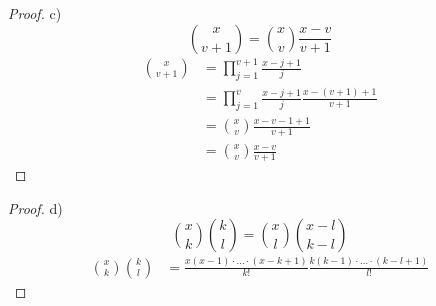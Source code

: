 \documentclass{exam}
\begin{document}
\begin{proof}
	c)
	\begin{displaymath}
		\binom{x}{v+1} = \binom{x}{v}\frac{x-v}{v+1}
	\end{displaymath}
	\begin{align}
		\binom{x}{v+1} & = \prod_{j=1}^{v+1}\frac{x-j+1}{j}                    \\
		               & = \prod_{j=1}^{v}\frac{x-j+1}{j}\frac{x-(v+1)+1}{v+1} \\
		               & = \binom{x}{v}\frac{x-v-1+1}{v+1}                     \\
		               & = \binom{x}{v}\frac{x-v}{v+1}
	\end{align}
\end{proof}
\begin{proof}
	d)
	\begin{displaymath}
		\binom{x}{k}\binom{k}{l} = \binom{x}{l}\binom{x-l}{k-l}
	\end{displaymath}
	\begin{align}
		\binom{x}{k}\binom{k}{l} & = \frac{x(x-1)\cdot\ldots\cdot(x-k+1)}{k!}\frac{k(k-1)\cdot\ldots\cdot(k-l+1)}{l!}
	\end{align}
\end{proof}

\pagebreak
\end{document}
